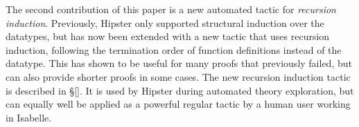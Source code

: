 The second contribution of this paper is a new automated tactic for \emph{recursion induction}. Previously, Hipster only supported structural induction over the datatypes, but has now been extended with a new tactic that uses recursion induction, following the termination order of function definitions instead of the datatype. This has shown to be useful for many proofs that previously failed, but can also provide shorter proofs in some cases. The new recursion induction tactic is described in \S \ref{}. It is used by Hipster during automated theory exploration, but can equally well be applied as a powerful regular tactic by a human user working in Isabelle.

  